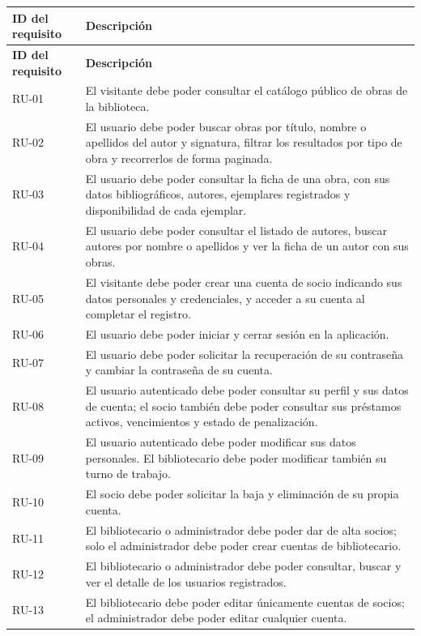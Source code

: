 \documentclass[a4paper,10pt]{article}
\begin{document}
\small
\begin{longtable}{|>{\raggedright\arraybackslash}p{2.8cm}|>{\raggedright\arraybackslash}p{12.2cm}|}
\hline
\textbf{ID del requisito} & \textbf{Descripción} \\
\hline
\endfirsthead
\hline
\textbf{ID del requisito} & \textbf{Descripción} \\
\hline
\endhead
RU-01 & El visitante debe poder consultar el catálogo público de obras de la biblioteca. \\
\hline
RU-02 & El usuario debe poder buscar obras por título, nombre o apellidos del autor y signatura, filtrar los resultados por tipo de obra y recorrerlos de forma paginada. \\
\hline
RU-03 & El usuario debe poder consultar la ficha de una obra, con sus datos bibliográficos, autores, ejemplares registrados y disponibilidad de cada ejemplar. \\
\hline
RU-04 & El usuario debe poder consultar el listado de autores, buscar autores por nombre o apellidos y ver la ficha de un autor con sus obras. \\
\hline
RU-05 & El visitante debe poder crear una cuenta de socio indicando sus datos personales y credenciales, y acceder a su cuenta al completar el registro. \\
\hline
RU-06 & El usuario debe poder iniciar y cerrar sesión en la aplicación. \\
\hline
RU-07 & El usuario debe poder solicitar la recuperación de su contraseña y cambiar la contraseña de su cuenta. \\
\hline
RU-08 & El usuario autenticado debe poder consultar su perfil y sus datos de cuenta; el socio también debe poder consultar sus préstamos activos, vencimientos y estado de penalización. \\
\hline
RU-09 & El usuario autenticado debe poder modificar sus datos personales. El bibliotecario debe poder modificar también su turno de trabajo. \\
\hline
RU-10 & El socio debe poder solicitar la baja y eliminación de su propia cuenta. \\
\hline
RU-11 & El bibliotecario o administrador debe poder dar de alta socios; solo el administrador debe poder crear cuentas de bibliotecario. \\
\hline
RU-12 & El bibliotecario o administrador debe poder consultar, buscar y ver el detalle de los usuarios registrados. \\
\hline
RU-13 & El bibliotecario debe poder editar únicamente cuentas de socios; el administrador debe poder editar cualquier cuenta. \\

\end{longtable}
\end{document}
